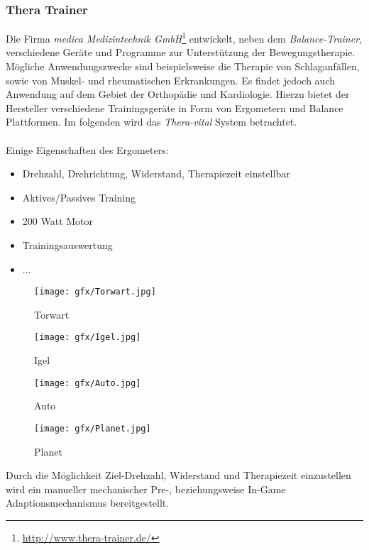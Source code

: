 		\subsubsection{Thera Trainer}\label{theravital}
			\label{theratrainer}
			Die Firma \textit{medica Medizintechnik GmbH}\footnote{\url{http://www.thera-trainer.de/}} entwickelt, neben dem \textit{Balance-Trainer}, verschiedene Geräte und Programme zur Unterstützung der Bewegungstherapie. Mögliche Anwendungszwecke sind beispielsweise die Therapie von Schlaganfällen, sowie von Muskel- und rheumatischen Erkrankungen. Es findet jedoch auch Anwendung auf dem Gebiet der Orthopädie und Kardiologie. Hierzu bietet der Hersteller verschiedene Trainingsgeräte in Form von Ergometern und Balance Plattformen. Im folgenden wird das \textit{Thera-vital} System betrachtet.
			\\ \\
			Einige Eigenschaften des Ergometers:
			\begin{itemize}
				\item{Drehzahl, Drehrichtung, Widerstand, Therapiezeit einstellbar}
				\item{Aktives/Passives Training}
				\item{200 Watt Motor}
				\item{Trainingsauswertung}
				\item{...}
			\end{itemize}
\begin{figure}[htbp]
	 	 		\centering
	  			\begin{minipage}[b]{6 cm}
    					\texttt{[image: gfx/Torwart.jpg]}
    					\caption{Torwart}
    					\label{Torwart}
	  			\end{minipage}
  				\begin{minipage}[b]{6 cm}
    					\texttt{[image: gfx/Igel.jpg]}
    					\caption{Igel}
    					\label{Igel}
  				\end{minipage}
				\begin{minipage}[b]{6 cm}
    					\texttt{[image: gfx/Auto.jpg]}  
    					\caption{Auto}
    					\label{Auto}
  				\end{minipage}
				\begin{minipage}[b]{6 cm}
    					\texttt{[image: gfx/Planet.jpg]}  
    					\caption{Planet}
    					\label{Planet}
  				\end{minipage}
			\end{figure}
			Durch die Möglichkeit Ziel-Drehzahl, Widerstand und Therapiezeit einzustellen wird ein manueller mechanischer 				Pre-, beziehungsweise In-Game Adaptionsmechanismus bereitgestellt.
